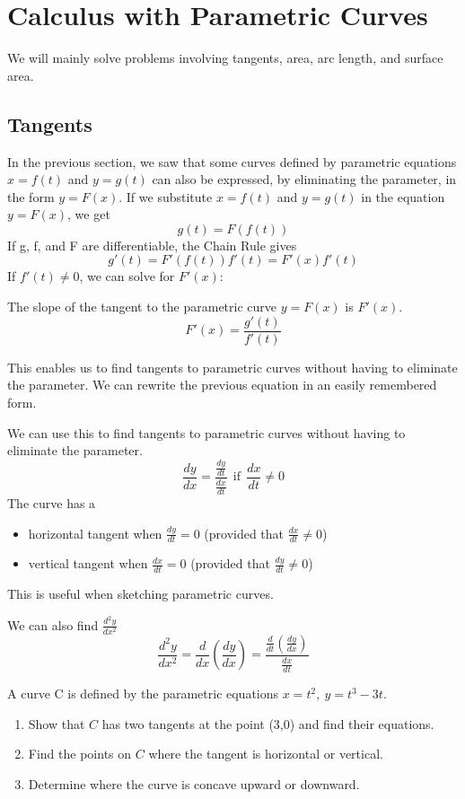 \section{Calculus with Parametric Curves}
  We will mainly solve problems involving tangents, area, arc length, and surface area.

  \subsection*{Tangents}
    In the previous section, we saw that some curves defined by parametric equations $ x = f(t) $ and $ y = g(t) $ can also be expressed, by eliminating the parameter, in the form $ y = F(x) $. If we substitute $ x = f(t) $ and $ y = g(t) $ in the equation $ y = F(x) $, we get
      $$ g(t) = F(f(t)) $$
    If g, f, and F are differentiable, the Chain Rule gives
      $$ g'(t) = F'(f(t))f'(t) = F'(x)f'(t) $$
    If $ f'(t) \neq 0 $, we can solve for $F'(x)$:
    \begin{definition}
      The slope of the tangent to the parametric curve $y=F(x)$ is $F'(x)$.
      $$ F'(x) = \frac{g'(t)}{f'(t)} $$
    \end{definition}
    This enables us to find tangents to parametric curves without having to eliminate the parameter. We can rewrite the
    previous equation in an easily remembered form.
    \begin{definition}
      We can use this to find tangents to parametric curves without having to eliminate the parameter.
      $$ \frac{dy}{dx} = \frac{\frac{dy}{dt}}{\frac{dx}{dt}} \ \ \text{if} \ \ \frac{dx}{dt} \neq 0$$
      The curve has a
      \begin{itemize}
        \item horizontal tangent when $ \frac{dy}{dt} = 0 $ (provided that $\frac{dx}{dt} \neq 0$)
        \item vertical tangent when $ \frac{dx}{dt} = 0 $ (provided that $\frac{dy}{dt} \neq 0$)
      \end{itemize}
      This is useful when sketching parametric curves.
    \end{definition}
    \begin{definition}
      We can also find $ \frac{d^2 y}{dx^2}$
      $$ \frac{d^2 y}{dx^2} = \frac{d}{dx}\left(\frac{dy}{dx}\right) = \frac{\frac{d}{dt}\left(\frac{dy}{dx}\right)}{\frac{dx}{dt}}$$
    \end{definition}
    \begin{example}
      A curve C is defined by the parametric equations $ {x=t^2 ,\ y=t^3 -3t }$.
      \begin{enumerate}
        \item Show that $C$ has two tangents at the point (3,0) and find their equations.
        \item Find the points on $C$ where the tangent is horizontal or vertical.
        \item Determine where the curve is concave upward or downward.
      \end{enumerate}
    \end{example}

